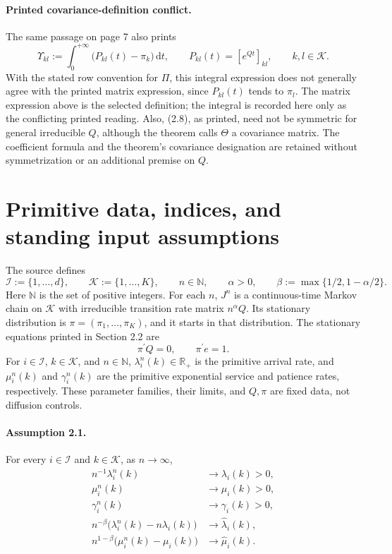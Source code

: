 \documentclass{article}
\begin{document}
\paragraph{Printed covariance-definition conflict.}
The same passage on page 7 also prints
\[
\Upsilon_{kl}:=\int_0^{+\infty}\bigl(P_{kl}(t)-\pi_k\bigr)\,\mathrm dt,
\qquad P_{kl}(t)=[e^{Qt}]_{kl},\qquad k,l\in\mathcal K.
\]
With the stated row convention for \(\Pi\), this integral expression does not generally agree with the printed matrix expression, since \(P_{kl}(t)\) tends to \(\pi_l\). The matrix expression above is the selected definition; the integral is recorded here only as the conflicting printed reading. Also, (2.8), as printed, need not be symmetric for general irreducible \(Q\), although the theorem calls \(\Theta\) a covariance matrix. The coefficient formula and the theorem's covariance designation are retained without symmetrization or an additional premise on \(Q\).

\section*{Primitive data, indices, and standing input assumptions}
The source defines
\[
\mathcal I:=\{1,\ldots,d\},\qquad
\mathcal K:=\{1,\ldots,K\},\qquad n\in\mathbb N,
\qquad \alpha>0,
\qquad \beta:=\max\{1/2,1-\alpha/2\}.
\]
Here \(\mathbb N\) is the set of positive integers. For each \(n\), \(J^n\) is a continuous-time Markov chain on \(\mathcal K\) with irreducible transition rate matrix \(n^\alpha Q\). Its stationary distribution is \(\pi=(\pi_1,\ldots,\pi_K)\), and it starts in that distribution. The stationary equations printed in Section 2.2 are
\[
\pi^\prime Q=0,\qquad \pi^\prime e=1.
\]
For \(i\in\mathcal I\), \(k\in\mathcal K\), and \(n\in\mathbb N\), \(\lambda_i^n(k)\in\mathbb R_+\) is the primitive arrival rate, and \(\mu_i^n(k)\) and \(\gamma_i^n(k)\) are the primitive exponential service and patience rates, respectively. These parameter families, their limits, and \(Q,\pi\) are fixed data, not diffusion controls.

\paragraph{Assumption 2.1.}
For every \(i\in\mathcal I\) and \(k\in\mathcal K\), as \(n\to\infty\),
\[
\begin{aligned}
n^{-1}\lambda_i^n(k)&\longrightarrow\lambda_i(k)>0,\\
\mu_i^n(k)&\longrightarrow\mu_i(k)>0,\\
\gamma_i^n(k)&\longrightarrow\gamma_i(k)>0,\\
n^{-\beta}\bigl(\lambda_i^n(k)-n\lambda_i(k)\bigr)&\longrightarrow\hat\lambda_i(k),\\
n^{1-\beta}\bigl(\mu_i^n(k)-\mu_i(k)\bigr)&\longrightarrow\hat\mu_i(k).
\end{aligned}
\]
\end{document}
